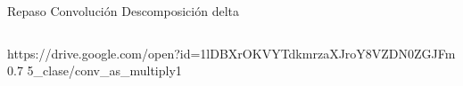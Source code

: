 \begin{frame}{Repaso Convolución }{Descomposición delta}
\begin{columns}[c]
      \vrule
      \hspace{2pt}
      \begin{column}{0.6\textwidth}
         {https://drive.google.com/open?id=1lDBXrOKVYTdkmrzaXJroY8VZDN0ZGJFm}
         {0.7}
         {5_clase/conv_as_multiply1}
      \end{column}
   \end{columns}
   \vfill
\end{frame}
